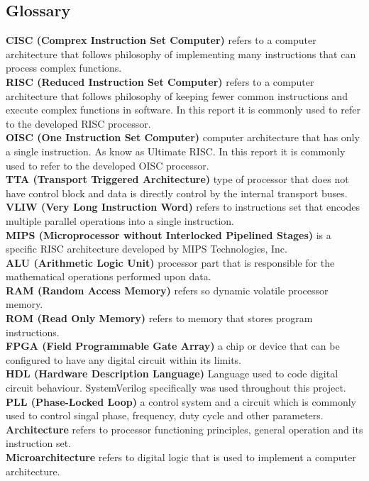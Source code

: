 \subsection{Glossary}\label{subsec:glossary}
\textbf{CISC (Comprex Instruction Set Computer)} refers to a computer architecture that follows philosophy of implementing many instructions that can process complex functions.\\
\textbf{RISC (Reduced Instruction Set Computer)} refers to a computer architecture that follows philosophy of keeping fewer common instructions and execute complex functions in software. In this report it is commonly used to refer to the developed RISC processor.\\
\textbf{OISC (One Instruction Set Computer)} computer architecture that has only a single instruction. As know as Ultimate RISC. In this report it is commonly used to refer to the developed OISC processor.\\
\textbf{TTA (Transport Triggered Architecture)} type of processor that does not have control block and data is directly control by the internal transport buses.\\
\textbf{VLIW (Very Long Instruction Word)} refers to instructions set that encodes multiple parallel operations into a single instruction.\\
\textbf{MIPS (Microprocessor without Interlocked Pipelined Stages)} is a specific RISC architecture developed by MIPS Technologies, Inc.\\
\textbf{ALU (Arithmetic Logic Unit)} processor part that is responsible for the mathematical operations performed upon data.\\
\textbf{RAM (Random Access Memory)} refers so dynamic volatile processor memory.\\
\textbf{ROM (Read Only Memory)} refers to memory that stores program instructions.\\
\textbf{FPGA (Field Programmable Gate Array)} a chip or device that can be configured to have any digital circuit within its limits.\\
\textbf{HDL (Hardware Description Language)} Language used to code digital circuit behaviour. SystemVerilog specifically was used throughout this project.\\
\textbf{PLL (Phase-Locked Loop)} a control system and a circuit which is commonly used to control singal phase, frequency, duty cycle and other parameters.\\
\textbf{Architecture} refers to processor functioning principles, general operation and its instruction set.\\
\textbf{Microarchitecture} refers to digital logic that is used to implement a computer architecture.


